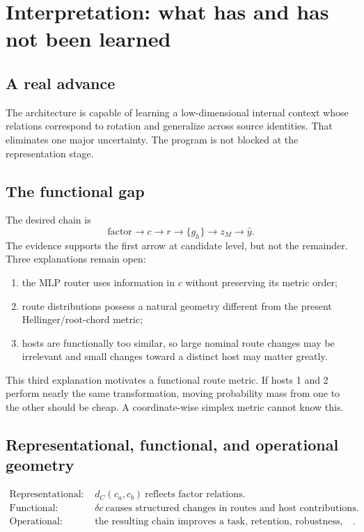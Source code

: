 \documentclass[11pt,a4paper]{article}
\begin{document}
\section{Interpretation: what has and has not been learned}

\subsection{A real advance}

The architecture is capable of learning a low-dimensional internal context whose relations correspond to rotation and generalize across source identities. That eliminates one major uncertainty. The program is not blocked at the representation stage.

\subsection{The functional gap}

The desired chain is
\begin{equation}
 \text{factor}\rightarrow c\rightarrow r\rightarrow\{g_h\}\rightarrow z_M\rightarrow\hat y.
\end{equation}
The evidence supports the first arrow at candidate level, but not the remainder. Three explanations remain open:
\begin{enumerate}
\item the MLP router uses information in $c$ without preserving its metric order;
\item route distributions possess a natural geometry different from the present Hellinger/root-chord metric;
\item hosts are functionally too similar, so large nominal route changes may be irrelevant and small changes toward a distinct host may matter greatly.
\end{enumerate}

This third explanation motivates a functional route metric. If hosts 1 and 2 perform nearly the same transformation, moving probability mass from one to the other should be cheap. A coordinate-wise simplex metric cannot know this.

\subsection{Representational, functional, and operational geometry}

\begin{mathbox}
\begin{align*}
\text{Representational: }& d_C(c_a,c_b)\ \text{reflects factor relations}.\\
\text{Functional: }& \delta c\ \text{causes structured changes in routes and host contributions}.\\
\text{Operational: }& \text{the resulting chain improves a task, retention, robustness, or cost}. 
\end{align*}
\end{mathbox}
\end{document}
